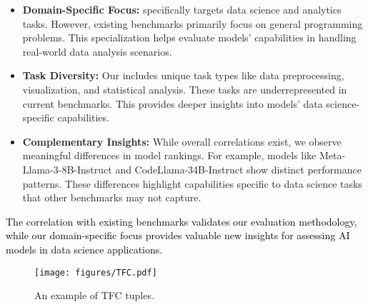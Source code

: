 \begin{itemize}[leftmargin=*,itemsep=0pt,parsep=0.5em,topsep=0.3em,partopsep=0.3em]
    \item \textbf{Domain-Specific Focus:} \benchmark\space specifically targets data science and analytics tasks. However, existing benchmarks primarily focus on general programming problems. This specialization helps evaluate models' capabilities in handling real-world data analysis scenarios.

    \item \textbf{Task Diversity:} Our \benchmark\space includes unique task types like data preprocessing, visualization, and statistical analysis. These tasks are underrepresented in current benchmarks. This provides deeper insights into models' data science-specific capabilities.

    \item \textbf{Complementary Insights:} While overall correlations exist, we observe meaningful differences in model rankings. For example, models like Meta-Llama-3-8B-Instruct and CodeLlama-34B-Instruct show distinct performance patterns. These differences highlight capabilities specific to data science tasks that other benchmarks may not capture.
\end{itemize}
\textcolor{black}{The correlation with existing benchmarks validates our evaluation methodology, while our domain-specific focus provides valuable new insights for assessing AI models in data science applications.}


\begin{figure}[t!]
    \centering
    \texttt{[image: figures/TFC.pdf]}
    \caption{An example of TFC tuples.}
    \label{fig: tfc}
\end{figure}


